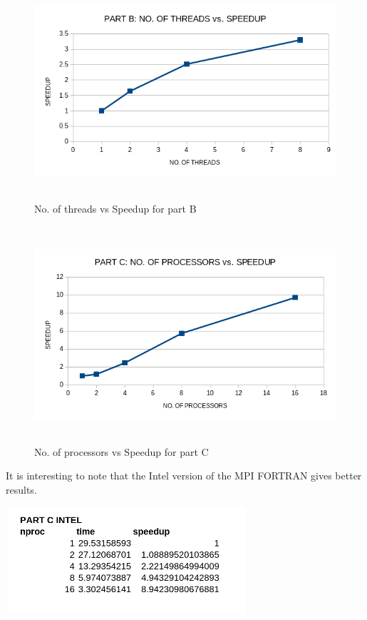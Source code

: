 \documentclass[12pt]{article}
\begin{document}
    \begin{figure}[H]
        \hfill\includegraphics[width=150mm,height= 80mm]{partBplot.png}\hspace*{\fill}
        \caption{No. of threads vs Speedup for part B}
    \end{figure}


    \begin{figure}[H]
        \hfill\includegraphics[width=150mm,height= 80mm]{partCplot.png}\hspace*{\fill}
        \caption{No. of processors vs Speedup for part C}
    \end{figure}

    \iffalse
    \newpage
    \noindent
    It is interesting to note that the Intel version of the MPI FORTRAN gives better results. 

    \hfill\includegraphics[height = 40mm, width = 90mm]{intel.png}\hspace*{\fill}
\end{document}
